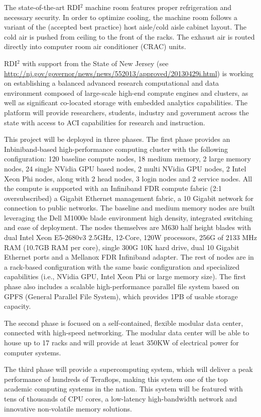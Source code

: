 The state-of-the-art RDI$^2$ machine room features proper refrigeration and necessary security. In order to optimize cooling, the machine room follows a variant of the (accepted best practice) host aisle/cold aisle cabinet layout. The cold air is pushed from ceiling to the front of the racks. The exhaust air is routed directly into computer room air conditioner (CRAC) units.

RDI$^2$ with support from the State of New Jersey (see  \url{http://nj.gov/governor/news/news/552013/approved/20130429i.html}) is working on establishing a balanced advanced research computational and data environment composed of large-scale high-end compute engines and clusters, as well as significant co-located storage with embedded analytics capabilities. The platform will provide researchers, students, industry and government across the state with access to ACI capabilities for research and instruction.

This project will be deployed in three phases. The first phase provides an Inbiniband-based high-performance computing cluster with the following configuration: 120 baseline compute nodes, 18 medium memory, 2 large memory nodes, 24 single NVidia GPU based nodes, 2 multi NVidia GPU nodes, 2 Intel Xeon Phi nodes, along with 2 head nodes, 3 login nodes and 2 service nodes. All the compute is supported with an Infiniband FDR compute fabric (2:1 oversubscribed) a Gigabit Ethernet management fabric, a 10 Gigabit network for connection to public networks. The baseline and medium memory nodes are built leveraging the Dell M1000e blade environment high density, integrated switching and ease of deployment. The nodes themselves are M630 half height blades with dual Intel Xeon E5-2680v3 2.5GHz, 12-Core, 120W processors, 256G of 2133 MHz RAM (10.7GB RAM per core), single 300G 10K hard drive, dual 10 Gigabit Ethernet ports and a Mellanox FDR Infiniband adapter. The rest of nodes are in a rack-based configuration with the same basic configuration and specialized capabilities (i.e., NVidia GPU, Intel Xeon Phi or large memory size). The first phase also includes a scalable high-performance parallel file system based on GPFS (General Parallel File System), which provides 1PB of usable storage capacity.

The second phase is focused on a self-contained, flexible modular data center, connected with high-speed networking. The modular data center will be able to house up to 17 racks and will provide at least 350KW of electrical power for computer systems.

The third phase will provide a supercomputing system, which will deliver a peak performance of hundreds of Teraflops, making this system one of the top academic computing systems in the nation. This system will be featured with tens of thousands of CPU cores, a low-latency high-bandwidth network and innovative non-volatile memory solutions.

